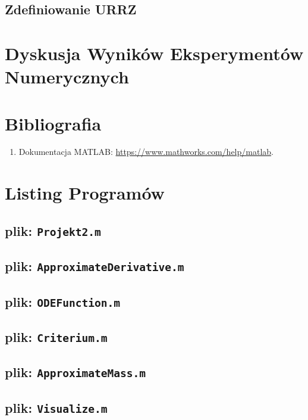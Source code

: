 \documentclass[a4paper, 12pt, twoside, openany]{article}
\begin{document}
	\subsection{Zdefiniowanie URRZ}
	
	\section{Dyskusja Wyników Eksperymentów Numerycznych}
	
	\newpage
	
	\section*{Bibliografia}
	\begin{enumerate}
		\item Dokumentacja MATLAB: \url{https://www.mathworks.com/help/matlab}.
	\end{enumerate}
	
	\newpage
	
	\section*{Listing Programów}
	
	\subsection*{plik: \texttt{Projekt2.m}}\vspace{-0.5em}
	
	\subsection*{plik: \texttt{ApproximateDerivative.m}}\vspace{-0.5em}
	
	\subsection*{plik: \texttt{ODEFunction.m}}\vspace{-0.5em}
	
	\subsection*{plik: \texttt{Criterium.m}}\vspace{-0.5em}
	
	\subsection*{plik: \texttt{ApproximateMass.m}}\vspace{-0.5em}
	
	\subsection*{plik: \texttt{Visualize.m}}\vspace{-0.5em}
	
\end{document}
